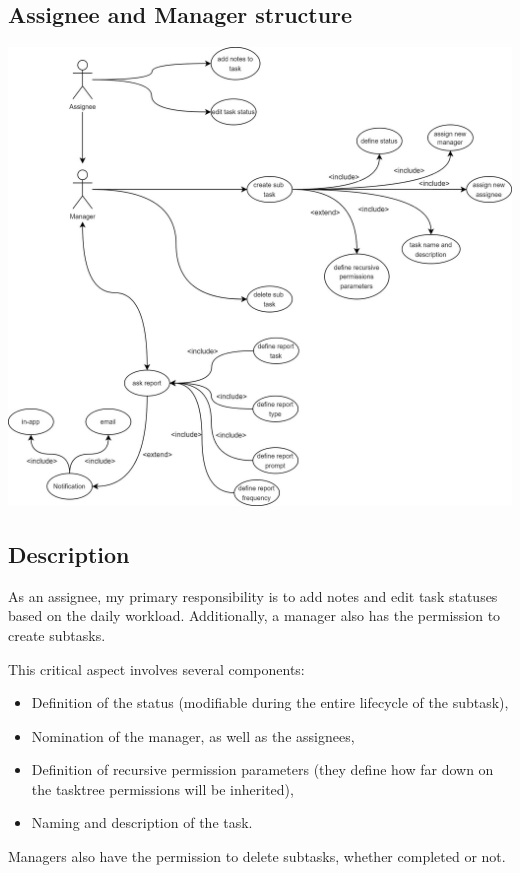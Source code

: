 \documentclass{article}
\begin{document}
\subsection{Assignee and Manager structure}
\includegraphics[width=\textwidth, keepaspectratio]{images/UseCaseDiagram/UseCaseAssigneeManager.jpg}
\subsection*{Description}
As an assignee, my primary responsibility is to add notes and edit task statuses based on the daily workload. Additionally, a manager also has the permission to create subtasks.

This critical aspect involves several components:
\begin{itemize}
\item Definition of the status (modifiable during the entire lifecycle of the subtask),
\item Nomination of the manager, as well as the assignees,
\item Definition of recursive permission parameters (they define how far down on the tasktree permissions will be inherited),
\item Naming and description of the task.
\end{itemize}

Managers also have the permission to delete subtasks, whether completed or not.
\end{document}
